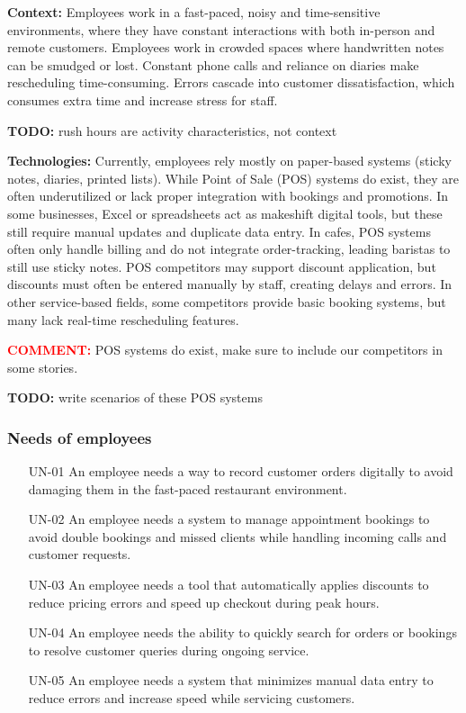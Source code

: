 \documentclass[]{VUMIFTemplateClass}
\newcommand{\yellowcomment}[1]{%
    \begin{tcolorbox}[colback=yellow!80, colframe=yellow!80, arc=0pt, outer arc=0pt, boxrule=0pt, left=3pt, right=3pt, top=3pt, bottom=3pt]
        \textbf{\textcolor{red}{COMMENT:}} #1
    \end{tcolorbox}
}
\newcommand{\todocomment}[1]{%
    \begin{tcolorbox}[colback=red!20, colframe=red!60, arc=0pt, outer arc=0pt, boxrule=1pt, left=3pt, right=3pt, top=3pt, bottom=3pt]
        \textbf{\textcolor{orange!70!black}{TODO:}} #1
    \end{tcolorbox}
}
\begin{document}
    
    \textbf{Context:} Employees work in a fast-paced, noisy and time-sensitive
environments, where they have constant interactions with both in-person and remote customers. Employees work in crowded spaces where handwritten notes can be smudged or lost. Constant phone calls and reliance on diaries make rescheduling time-consuming. Errors cascade into customer dissatisfaction, which consumes extra time and increase stress for staff.
    \todocomment{rush hours are activity characteristics, not context}
    
    \textbf{Technologies:} Currently, employees rely mostly on paper-based systems (sticky notes, diaries, printed lists). While Point of Sale (POS) systems do exist, they are often underutilized or lack proper integration with bookings and promotions. In some businesses, Excel or spreadsheets act as makeshift digital tools, but these still require manual updates and duplicate data entry. In cafes, POS systems often only handle billing and do not integrate order-tracking, leading baristas to still use sticky notes. POS competitors may support discount application, but discounts must often be entered manually by staff, creating delays and errors. In other service-based fields, some competitors provide basic booking systems, but many lack real-time rescheduling features. 

    \yellowcomment{POS systems do exist, make sure to include our competitors in some stories.}
    \todocomment{write scenarios of these POS systems}
\subsubsection{Needs of employees}
\begin{itemize}
    \item[UN-01] An employee needs a way to record customer orders digitally to avoid damaging them in the fast-paced restaurant environment.
    \item[UN-02] An employee needs a system to manage appointment bookings to avoid double bookings and missed clients while handling incoming calls and customer requests.
    \item[UN-03] An employee needs a tool that automatically applies discounts to reduce pricing errors and speed up checkout during peak hours.
    \item[UN-04] An employee needs the ability to quickly search for orders or bookings to resolve customer queries during ongoing service.
    \item[UN-05] An employee needs a system that minimizes manual data entry to reduce errors and increase speed while servicing customers.
\end{itemize}
\end{document}
